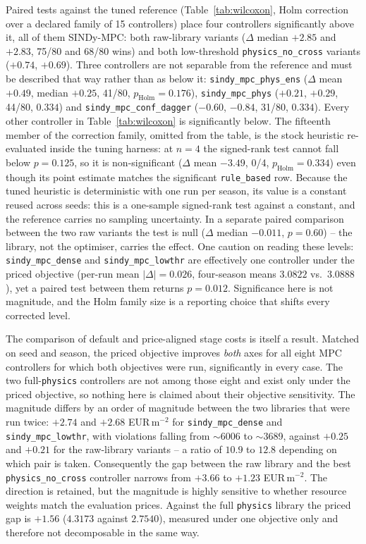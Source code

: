 Paired tests against the tuned reference (Table~\ref{tab:wilcoxon}, Holm correction over a
declared family of 15 controllers) place four controllers
significantly above it, all of them SINDy-MPC: both raw-library variants ($\Delta$ median
$+2.85$ and $+2.83$, 75/80 and 68/80 wins) and both low-threshold
\texttt{physics\_no\_cross} variants ($+0.74$, $+0.69$). Three controllers are not
separable from the reference and must be described that way rather than as below it:
\texttt{sindy\_mpc\_phys\_ens} ($\Delta$ mean $+0.49$, median $+0.25$, 41/80,
$p_{\text{Holm}}=0.176$), \texttt{sindy\_mpc\_phys} ($+0.21$, $+0.29$, 44/80, $0.334$) and
\texttt{sindy\_mpc\_conf\_dagger} ($-0.60$, $-0.84$, 31/80, $0.334$). Every other
controller in Table~\ref{tab:wilcoxon} is significantly below. The fifteenth member of the
correction family, omitted from the table, is the stock heuristic re-evaluated inside the
tuning harness: at $n=4$ the signed-rank test cannot fall below $p=0.125$, so it is
non-significant ($\Delta$ mean $-3.49$, 0/4, $p_{\text{Holm}}=0.334$) even though its point
estimate matches the significant \texttt{rule\_based} row.
Because the tuned heuristic is deterministic with one run per season, its value is a
constant reused across seeds: this is a one-sample signed-rank test against a constant,
and the reference carries no sampling uncertainty. In a separate paired comparison between
the two raw variants the test is null ($\Delta$ median $-0.011$, $p=0.60$) -- the library,
not the optimiser, carries the effect. One caution on reading these levels:
\texttt{sindy\_mpc\_dense} and
\texttt{sindy\_mpc\_lowthr} are effectively one controller under the priced objective
(per-run mean $|\Delta|=0.026$, four-season means $3.0822$ vs.\ $3.0888$), yet a paired
test between them returns $p=0.012$. Significance here is not magnitude, and the Holm
family size is a reporting choice that shifts every corrected level.

The comparison of default and price-aligned stage costs is itself a result. Matched on
seed and season, the priced objective improves \emph{both} axes for all eight MPC
controllers for which both objectives were run, significantly in every case. The two
full-\texttt{physics} controllers are not among those eight and exist only under the priced
objective, so nothing here is claimed about their objective sensitivity. The magnitude differs
by an order of magnitude between the two libraries that were run twice: $+2.74$ and $+2.68$
EUR\,m$^{-2}$ for \texttt{sindy\_mpc\_dense} and \texttt{sindy\_mpc\_lowthr}, with
violations falling from $\sim$6006 to $\sim$3689, against $+0.25$ and $+0.21$ for the
raw-library variants -- a ratio of $10.9$ to $12.8$ depending on which pair is taken.
Consequently the gap between the raw library and the best
\texttt{physics\_no\_cross} controller narrows from $+3.66$ to $+1.23$ EUR\,m$^{-2}$.
The direction is retained, but the magnitude is highly sensitive to whether resource
weights match the evaluation prices. Against the full
\texttt{physics} library the priced gap is $+1.56$ ($4.3173$ against $2.7540$), measured
under one objective only and therefore not decomposable in the same way.

